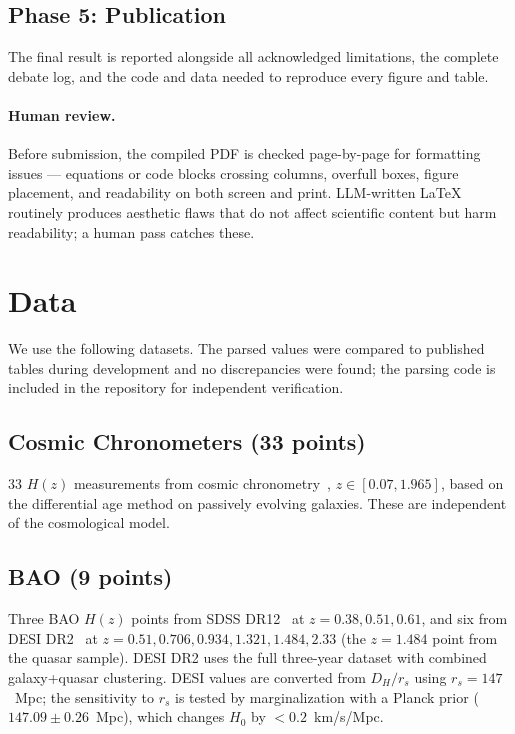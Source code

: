 \documentclass[twocolumn]{aastex631}
\begin{document}
\subsection{Phase 5: Publication}
The final result is reported alongside all acknowledged limitations,
the complete debate log, and the code and data needed to reproduce
every figure and table.

\paragraph{Human review.} Before submission, the compiled PDF is
checked page-by-page for formatting issues --- equations or code
blocks crossing columns, overfull boxes, figure placement, and
readability on both screen and print.  LLM-written LaTeX routinely
produces aesthetic flaws that do not affect scientific content but
harm readability; a human pass catches these.

\section{Data}
\label{sec:data}

We use the following datasets.  The parsed values were compared to
published tables during development and no discrepancies were found;
the parsing code is included in the repository for independent
verification.

\subsection{Cosmic Chronometers (33 points)}
33 $H(z)$ measurements from cosmic chronometry~\cite{cc_data},
$z\in[0.07,1.965]$, based on the differential age method on passively
evolving galaxies.  These are independent of the cosmological model.

\subsection{BAO (9 points)}
Three BAO $H(z)$ points from SDSS DR12~\cite{bao_sdss} at
$z=0.38,0.51,0.61$, and six from DESI DR2~\cite{desi_dr2} at
$z=0.51,0.706,0.934,1.321,1.484,2.33$ (the $z=1.484$ point from the
quasar sample).  DESI DR2 uses the full three-year dataset with
combined galaxy+quasar clustering.  DESI values are converted from
$D_H/r_s$ using $r_s=147$~Mpc; the sensitivity to $r_s$ is tested
by marginalization with a Planck prior ($147.09\pm0.26$~Mpc), which
changes $H_0$ by $<0.2$~km/s/Mpc.
\end{document}
